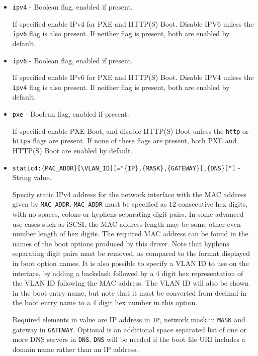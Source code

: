 \documentclass[]{article}
\begin{document}
\begin{itemize}
  \item \texttt{ipv4} - Boolean flag, enabled if present. \medskip

  If specified enable IPv4 for PXE and HTTP(S) Boot. Disable IPV6
  unless the \texttt{ipv6} flag is also present. If neither flag is
  present, both are enabled by default. \medskip

  \item \texttt{ipv6} - Boolean flag, enabled if present. \medskip

  If specified enable IPv6 for PXE and HTTP(S) Boot. Disable IPV4
  unless the \texttt{ipv4} flag is also present. If neither flag is
  present, both are enabled by default. \medskip

  \item \texttt{pxe} - Boolean flag, enabled if present. \medskip

  If specified enable PXE Boot, and disable HTTP(S) Boot unless
  the \texttt{http} or \texttt{https} flags are present.
  If none of these flags are present, both PXE and HTTP(S) Boot are
  enabled by default. \medskip

  \item \texttt{static4:\{MAC\_ADDR\}[\textbackslash VLAN\_ID][="\{IP\},\{MASK\},\{GATEWAY\}[,\{DNS\}]"]} - String value. \medskip

  Specify static IPv4 address for the network interface with the MAC address given by \texttt{MAC\_ADDR}. \texttt{MAC\_ADDR}
  must be specified as 12 consecutive hex digits, with no spaces, colons or hyphens separating digit pairs. In some advanced
  use-cases such as iSCSI, the MAC address length may be some other even number length of hex digits. The required
  MAC address can be found in the names of the boot options produced by this driver. Note that
  hyphens separating digit pairs must be removed, as compared to the format displayed in boot option names.
  It is also possible to specify a VLAN ID to use on the interface, by adding a backslash
  followed by a 4 digit hex representation of the VLAN ID following the MAC address. The VLAN ID will also be
  shown in the boot entry name, but note that it must be converted from decimal in the boot entry name to a
  4 digit hex number in this option.

  Required elements in value are IP address in \texttt{IP}, network mask in \texttt{MASK}
  and gateway in \texttt{GATEWAY}. Optional is an additional space separated list of one or more DNS servers
  in \texttt{DNS}. \texttt{DNS} will be needed if the boot file URI includes a domain name rather than an IP address.


\end{itemize}
\end{document}
